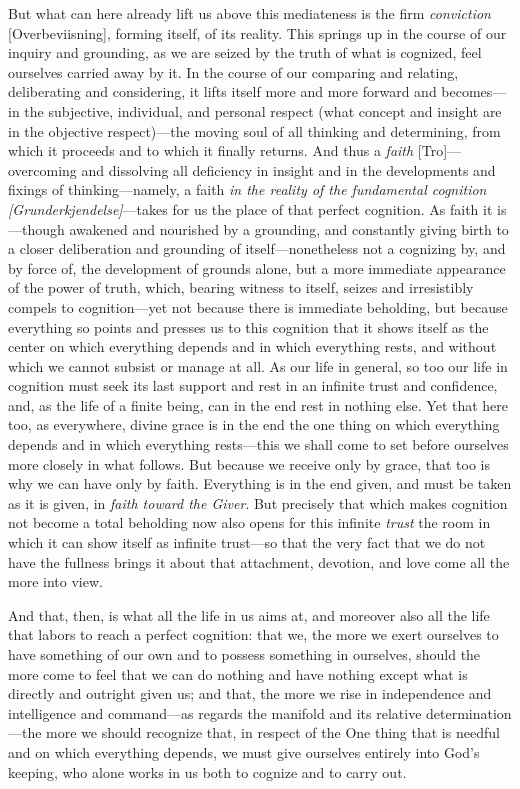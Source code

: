 \documentclass[12pt,a4paper]{book}
\begin{document}
But what can here already lift us above this mediateness is the firm
\emph{conviction} [Overbeviisning], forming itself, of its reality. This springs
up in the course of our inquiry and grounding, as we are seized by the truth of
what is cognized, feel ourselves carried away by it. In the course of our
comparing and relating, deliberating and considering, it lifts itself more and
more forward and becomes---in the subjective, individual, and personal respect
(what concept and insight are in the objective respect)---the moving soul of all
thinking and determining, from which it proceeds and to which it finally returns.
And thus a \emph{faith} [Tro]---overcoming and dissolving all deficiency in
insight and in the developments and fixings of thinking---namely, a faith \emph{in
the reality of the fundamental cognition [Grunderkjendelse]}---takes for us the
place of that perfect cognition. As faith it is---though awakened and nourished by
a grounding, and constantly giving birth to a closer deliberation and grounding of
itself---nonetheless not a cognizing by, and by force of, the development of
grounds alone, but a more immediate appearance of the power of truth, which,
bearing witness to itself, seizes and irresistibly compels to cognition---yet not
because there is immediate beholding, but because everything so points and presses
us to this cognition that it shows itself as the center on which everything
depends and in which everything rests, and without which we cannot subsist or
manage at all. As our life in general, so too our life in cognition must seek its
last support and rest in an infinite trust and confidence, and, as the life of a
finite being, can in the end rest in nothing else. Yet that here too, as
everywhere, divine grace is in the end the one thing on which everything depends
and in which everything rests---this we shall come to set before ourselves more
closely in what follows. But because we receive only by grace, that too is why we
can have only by faith. Everything is in the end given, and must be taken as it is
given, in \emph{faith toward the Giver}. But precisely that which makes cognition not
become a total beholding now also opens for this infinite \emph{trust} the room in which
it can show itself as infinite trust---so that the very fact that we do not have
the fullness brings it about that attachment, devotion, and love come all the
more into view.

And that, then, is what all the life in us aims at, and moreover also all the life
that labors to reach a perfect cognition: that we, the more we exert ourselves to
have something of our own and to possess something in ourselves, should the more
come to feel that we can do nothing and have nothing except what is directly and
outright given us; and that, the more we rise in independence and intelligence and
command---as regards the manifold and its relative determination---the more we
should recognize that, in respect of the One thing that is needful and on which
everything depends, we must give ourselves entirely into God's keeping, who alone
works in us both to cognize and to carry out.
\end{document}

